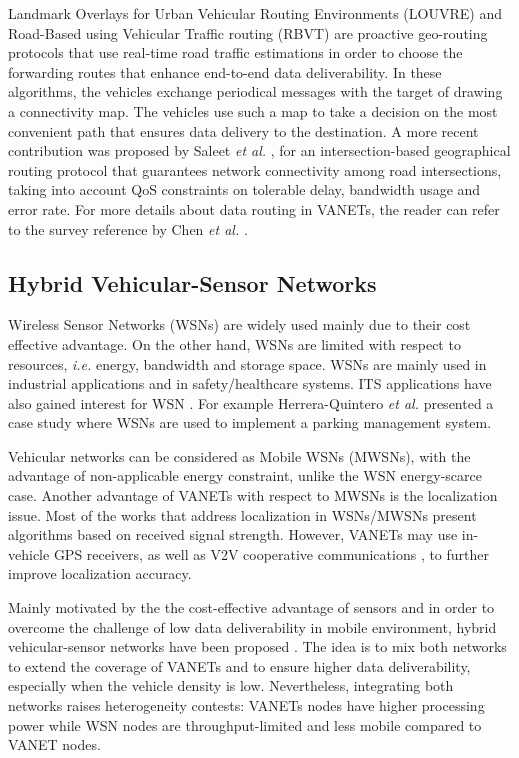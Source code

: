 \documentclass[10pt,onecolumn]{article}
\begin{document}
Landmark Overlays for Urban Vehicular Routing Environments (LOUVRE) \cite{Lee2008} and Road-Based using Vehicular Traffic routing (RBVT) \cite{Nzouonta2009} are proactive geo-routing protocols that use real-time road traffic estimations in order to choose the forwarding routes that enhance end-to-end data deliverability. In these algorithms, the vehicles exchange periodical messages with the target of drawing a connectivity map. The vehicles use such a map to take a decision on the most convenient path that ensures data delivery to the destination.
A more recent contribution was proposed by Saleet \textit{et al.} \cite{Saleet2011}, for an intersection-based geographical routing protocol that guarantees network connectivity among road intersections, taking into account QoS constraints on tolerable delay, bandwidth usage and error rate. For more details about data routing in VANETs, the reader can refer to the survey reference by Chen \textit{et al.} \cite{Chen2009}.

\subsection{Hybrid Vehicular-Sensor Networks}

Wireless Sensor Networks (WSNs) are widely used mainly due to their cost effective advantage. On the other hand, WSNs are limited with respect to resources, \textit{i.e.} energy, bandwidth and storage space.
WSNs are mainly used in industrial applications and in safety/healthcare systems. ITS applications have also gained interest for WSN \cite{wsn-4-its} \cite{wsn-4-its2}. For example Herrera-Quintero \textit{et al.} \cite{wsn-4-its2} presented a case study where WSNs are used to implement a parking management system. 

Vehicular networks can be considered as Mobile WSNs (MWSNs), with the advantage of non-applicable energy constraint, unlike the WSN energy-scarce case. Another advantage of VANETs with respect to MWSNs is the localization issue. 
Most of the works that address localization in WSNs/MWSNs present algorithms based on received signal strength. 
However, VANETs may use in-vehicle GPS receivers, as well as V2V cooperative communications \cite{yao2011improving}, to further improve localization accuracy.

Mainly motivated by the the cost-effective advantage of sensors and in order to overcome the challenge of low data deliverability in mobile environment, hybrid vehicular-sensor networks have been proposed \cite{Barba2010} \cite{HuaQin2010} \cite{vanetWSN2}. 
The idea is to mix both networks to extend the coverage of VANETs and to ensure higher data deliverability, especially when the vehicle density is low. 
Nevertheless, integrating both networks raises heterogeneity contests: VANETs nodes have higher processing power while WSN nodes are throughput-limited and less mobile compared to VANET nodes. 
\end{document}
